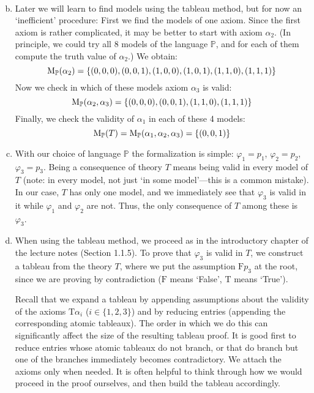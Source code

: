\begin{problem}
\begin{solution}
\begin{enumerate}[(a)]
\begin{align*}
            \end{align*}
            \item Later we will learn to find models using the tableau method, but for now an `inefficient' procedure: First we find the models of one axiom. Since the first axiom is rather complicated, it may be better to start with axiom $\alpha_2$. (In principle, we could try all 8 models of the language $\mathbb P$, and for each of them compute the truth value of $\alpha_2$.) We obtain:
            $$
            \operatorname{M}_\mathbb P(\alpha_2)=\{(0,0,0),(0,0,1),(1,0,0),(1,0,1),(1,1,0),(1,1,1)\}
            $$
            Now we check in which of these models axiom $\alpha_3$ is valid:
            $$
            \operatorname{M}_\mathbb P(\alpha_2,\alpha_3)=\{(0,0,0),(0,0,1),(1,1,0),(1,1,1)\}
            $$
            Finally, we check the validity of $\alpha_1$ in each of these 4 models:
            $$
            \operatorname{M}_\mathbb P(T)=\operatorname{M}_\mathbb P(\alpha_1,\alpha_2,\alpha_3)=\{(0,0,1)\}
            $$
            \item With our choice of language $\mathbb P$ the formalization is simple: $\varphi_1=p_1$, $\varphi_2=p_2$, $\varphi_3=p_3$. Being a consequence of theory $T$ means being valid in every model of $T$ (note: in every model, not just `in some model’---this is a common mistake). In our case, $T$ has only one model, and we immediately see that $\varphi_3$ is valid in it while $\varphi_1$ and $\varphi_2$ are not. Thus, the only consequence of $T$ among these is $\varphi_3$.
            \item When using the tableau method, we proceed as in the introductory chapter of the lecture notes (Section 1.1.5). To prove that $\varphi_3$ is valid in $T$, we construct a tableau from the theory $T$, where we put the assumption $\mathrm{F}p_3$ at the root, since we are proving by contradiction ($\mathrm{F}$ means `False’, $\mathrm{T}$ means `True’). 
            
            Recall that we expand a tableau by appending assumptions about the validity of the axioms $\mathrm{T}\alpha_i$ ($i\in\{1,2,3\}$) and by reducing entries (appending the corresponding atomic tableaux). The order in which we do this can significantly affect the size of the resulting tableau proof. It is good first to reduce entries whose atomic tableaux do not branch, or that do branch but one of the branches immediately becomes contradictory. We attach the axioms only when needed. It is often helpful to think through how we would proceed in the proof ourselves, and then build the tableau accordingly.


\end{enumerate}
\end{solution}
\end{problem}
